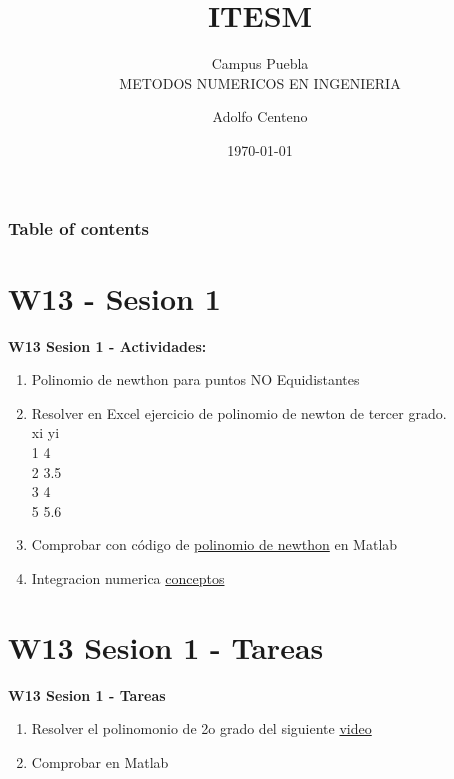 \documentclass{beamer}
\begin{document}
\title{ITESM}  
\subtitle{Campus Puebla\\METODOS NUMERICOS EN INGENIERIA
}
\author{Adolfo Centeno}
\date{\today} 


\begin{frame}
\titlepage
\end{frame}

\begin{frame}\frametitle{Table of contents}
\tableofcontents
\end{frame} 


\section{W13 - Sesion 1 }

\begin{frame}

\textbf{W13 Sesion 1 - Actividades:}

\begin{enumerate}
\item
	 Polinomio de newthon para puntos NO Equidistantes

\item
	Resolver en Excel  ejercicio de polinomio de newton de tercer grado. \\
	
xi	yi \\
1	4 \\
2	3.5 \\
3	4 \\
5   5.6

\item Comprobar con código de \href{https://github.com/adsoftsito/metodos-numericos/blob/master/w12/polinomionewthon/polnewton.pdf}{polinomio de newthon} en Matlab

\item Integracion numerica \href{https://github.com/adsoftsito/metodos-numericos/blob/master/w13/integracion_numerica.pdf}{conceptos} 



\end{enumerate} 

\end{frame}


\section{W13 Sesion 1 - Tareas }

\begin{frame}


\textbf{W13 Sesion 1 - Tareas}


\begin{enumerate}
\item

Resolver el polinomonio de 2o grado del siguiente \href{https://www.youtube.com/watch?v=AISHH6goWUs}{video}


\item
	Comprobar en Matlab


\end{enumerate} 


\end{frame}
\end{document}
